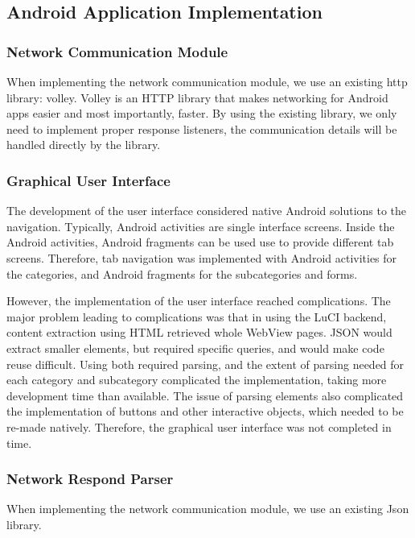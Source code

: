 \subsection{Android Application Implementation}
\subsubsection{Network Communication Module}
When implementing the network communication module, we use an existing http library: volley. Volley is an HTTP library that makes networking for Android apps easier and most importantly, faster.  By using the existing library, we only need to implement proper response listeners, the communication details will be handled directly by the library.

\subsubsection{Graphical User Interface}
The development of the user interface considered native Android solutions to the navigation. Typically, Android activities are single interface screens. Inside the Android activities, Android fragments can be used use to provide different tab screens. Therefore, tab navigation was implemented with Android activities for the categories, and Android fragments for the subcategories and forms.

However, the implementation of the user interface reached complications. The major problem leading to complications was that in using the LuCI backend, content extraction using HTML retrieved whole WebView pages. JSON would extract smaller elements, but required specific queries, and would make code reuse difficult. Using both required parsing, and the extent of parsing needed for each category and subcategory complicated the implementation, taking more development time than available. The issue of parsing elements also complicated the implementation of buttons and other interactive objects, which needed to be re-made natively. Therefore, the graphical user interface was not completed in time.

\subsubsection{Network Respond Parser}
When implementing the network communication module, we use an existing Json library.